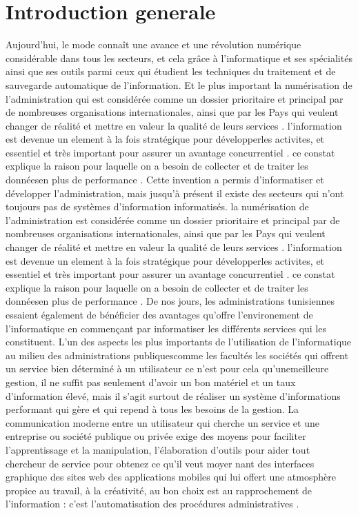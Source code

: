 \documentclass{article}
\begin{document}
\section{Introduction generale }

Aujourd'hui, le mode connaît une avance et une révolution numérique considérable dans tous les secteurs, et cela grâce à l’informatique et ses spécialités ainsi que ses outils parmi ceux qui étudient les techniques du traitement et de sauvegarde automatique de l’information. Et le plus important la numérisation de l'administration qui est considérée comme un dossier prioritaire et principal par de nombreuses organisations internationales, ainsi que par les Pays qui veulent changer de réalité et mettre en valeur la qualité de leurs services . l’information est devenue un element à la fois stratégique pour développerles activites, et essentiel et très important pour assurer un avantage concurrentiel . ce constat explique la raison pour laquelle on a besoin de collecter et de traiter les donnéesen plus de performance .
Cette invention a permis d’informatiser et développer l'administration, mais jusqu'à présent il existe des secteurs qui n’ont toujours pas de systèmes d’information informatisés. la numérisation de l'administration est considérée comme un dossier prioritaire et principal par de nombreuses organisations internationales, ainsi que par les Pays qui veulent changer de réalité et mettre en valeur la qualité de leurs services . l’information est devenue un element à la fois stratégique pour développerles activites, et essentiel et très important pour assurer un avantage concurrentiel . ce constat explique la raison pour laquelle on a besoin de collecter et de traiter les donnéesen plus de performance .
De nos jours, les administrations tunisiennes essaient également de bénéficier des avantages qu’offre l’environement de l’informatique en commençant par informatiser les différents services qui les constituent. L’un des aspects les plus importants de l’utilisation de l’informatique au milieu des administrations publiquescomme les facultés les sociétés qui offrent un service bien déterminé à un utilisateur ce n'est pour cela qu'unemeilleure gestion, il ne suffit pas seulement d’avoir un bon matériel et un taux d’information élevé, mais il s’agit surtout de réaliser un système d’informations performant qui gère et qui repend à tous les besoins de la gestion.
La communication moderne entre un utilisateur qui cherche un service et une entreprise ou société publique ou privée exige des moyens pour faciliter l'apprentissage et la manipulation, l’élaboration d'outils pour aider tout chercheur de service pour obtenez ce qu'il veut moyer nant des interfaces graphique des sites web des applications mobiles qui lui offert une atmosphère propice au travail, à la créativité, au bon choix est au rapprochement de l'information : c’est l'automatisation des procédures administratives .
\end{document}
